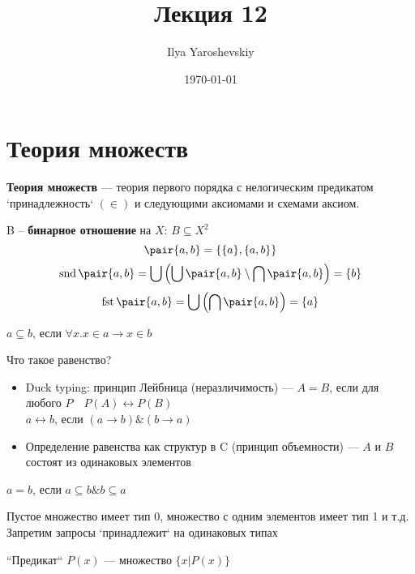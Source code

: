 \documentclass[english]{article}
\author{Ilya Yaroshevskiy}
\date{\today}
\title{Лекция 12}
\begin{document}
\maketitle
\tableofcontents


\section{Теория множеств}
\label{sec:org0a12783}
\begin{definition}
	\textbf{Теория множеств} --- теория первого порядка с нелогическим предикатом `принадлежность` \((\in)\) и следующими аксиомами и схемами аксиом.
	\label{org4d8496b}
\end{definition}
\begin{definition}
	B -- \textbf{бинарное отношение} на \(X\): \(B \subseteq X^2\)
	\[ \pair{a, b} = \{\{a\}, \{a, b\}\} \]
	\[ \mathop{\rm snd}\pair{a, b} = \bigcup\left(\bigcup \pair{a, b} \setminus \bigcap \pair{a, b}\right) = \{b\} \]
	\[ \mathop{\rm fst}\pair{a, b} = \bigcup\left(\bigcap \pair{a, b}\right) = \{a\} \]
	\label{orge45573e}
\end{definition}
\begin{definition}
	\(a \subseteq b\), если \(\forall x. x \in a \to x \in b\)
	\label{orge772436}
\end{definition}
\begin{remark}
	Что такое равенство?
	\begin{itemize}
		\item Duck typing: принцип Лейбница (неразличимость) --- \(A = B\), если для любого \(P \quad P(A) \leftrightarrow P(B)\) \\
		      \(a \leftrightarrow b\), если \((a \to b)\&(b \to a)\)
		\item Определение равенства как структур в C (принцип объемности) --- \(A\) и \(B\) состоят из одинаковых элементов
	\end{itemize}
\end{remark}
\begin{definition}
	\(a = b\), если \(a \subseteq b \& b \subseteq a\)
	\label{orgf6aa984}
\end{definition}
\begin{remark}
	Пустое множество имеет тип 0, множество с одним элементов имеет тип 1 и т.д. Запретим запросы `принадлежит` на одинаковых типах
\end{remark}
\begin{definition}
	``Предикат`` \(P(x)\) --- множество \(\{x \big| P(x)\}\)
	\label{org60dad37}
\end{definition}
\end{document}

